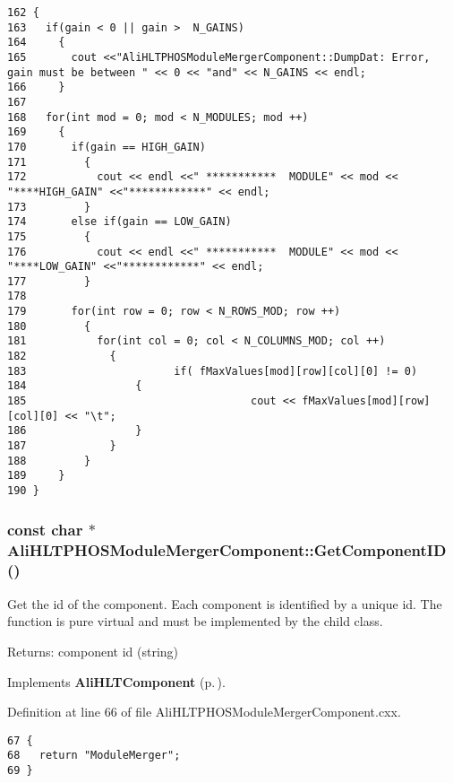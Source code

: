 \footnotesize\begin{verbatim}162 {
163   if(gain < 0 || gain >  N_GAINS)
164     {
165       cout <<"AliHLTPHOSModuleMergerComponent::DumpDat: Error, gain must be between " << 0 << "and" << N_GAINS << endl;
166     }
167   
168   for(int mod = 0; mod < N_MODULES; mod ++)
169     {
170       if(gain == HIGH_GAIN)
171         {
172           cout << endl <<" ***********  MODULE" << mod << "****HIGH_GAIN" <<"************" << endl;
173         }
174       else if(gain == LOW_GAIN)
175         {
176           cout << endl <<" ***********  MODULE" << mod << "****LOW_GAIN" <<"************" << endl;
177         }
178       
179       for(int row = 0; row < N_ROWS_MOD; row ++)
180         {
181           for(int col = 0; col < N_COLUMNS_MOD; col ++)
182             {
183                       if( fMaxValues[mod][row][col][0] != 0)
184                 { 
185                                   cout << fMaxValues[mod][row][col][0] << "\t";
186                 }
187             }
188         } 
189     }
190 }
\end{verbatim}\normalsize 


\subsubsection{\setlength{\rightskip}{0pt plus 5cm}const char $\ast$ Ali\-HLTPHOSModule\-Merger\-Component::Get\-Component\-ID ()\hspace{0.3cm}{\tt  [virtual]}}\label{classAliHLTPHOSModuleMergerComponent_a10}


Get the id of the component. Each component is identified by a unique id. The function is pure virtual and must be implemented by the child class. \begin{Desc}
\item[Returns:]component id (string) \end{Desc}


Implements {\bf Ali\-HLTComponent} {\rm (p.\,\pageref{classAliHLTComponent_a9})}.

Definition at line 66 of file Ali\-HLTPHOSModule\-Merger\-Component.cxx.

\footnotesize\begin{verbatim}67 {
68   return "ModuleMerger";
69 }
\end{verbatim}\normalsize 


